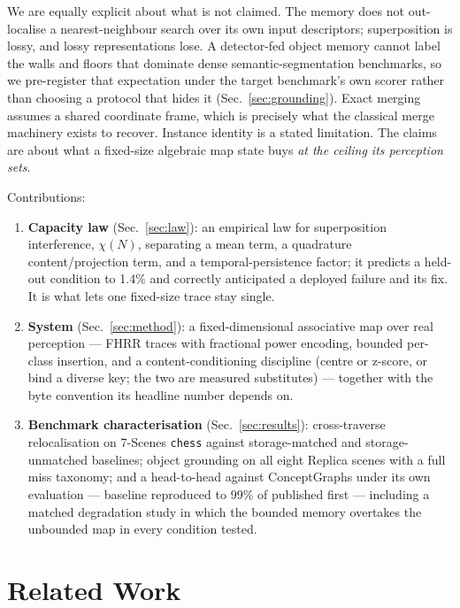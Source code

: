 \documentclass[conference]{IEEEtran}
\begin{document}
We are equally explicit about what is not claimed. The memory does not
out-localise a nearest-neighbour search over its own input descriptors;
superposition is lossy, and lossy representations lose. A detector-fed
object memory cannot label the walls and floors that dominate dense
semantic-segmentation benchmarks, so we pre-register that expectation
under the target benchmark's own scorer rather than choosing a protocol
that hides it (Sec.~\ref{sec:grounding}). Exact merging assumes a shared
coordinate frame, which is precisely what the classical merge machinery
exists to recover. Instance identity is a stated limitation. The claims
are about what a fixed-size algebraic map state buys \emph{at the ceiling
its perception sets}.

Contributions:
\begin{enumerate}
\item \textbf{Capacity law} (Sec.~\ref{sec:law}): an empirical law for
  superposition interference, $\chi(N)$, separating a mean term, a
  quadrature content/projection term, and a temporal-persistence factor;
  it predicts a held-out condition to 1.4\% and correctly anticipated a
  deployed failure and its fix. It is what lets one fixed-size trace stay
  single.
\item \textbf{System} (Sec.~\ref{sec:method}): a fixed-dimensional
  associative map over real perception --- FHRR traces with fractional
  power encoding, bounded per-class insertion, and a content-conditioning
  discipline (centre or z-score, or bind a diverse key; the two are
  measured substitutes) --- together with the byte convention its
  headline number depends on.
\item \textbf{Benchmark characterisation} (Sec.~\ref{sec:results}):
  cross-traverse relocalisation on 7-Scenes \texttt{chess} against
  storage-matched and storage-unmatched baselines; object grounding on
  all eight Replica scenes with a full miss taxonomy; and a head-to-head
  against ConceptGraphs under its own evaluation --- baseline reproduced
  to 99\% of published first --- including a matched degradation study
  in which the bounded memory overtakes the unbounded map in every
  condition tested.
\end{enumerate}

\section{Related Work}
\label{sec:related}
\end{document}
